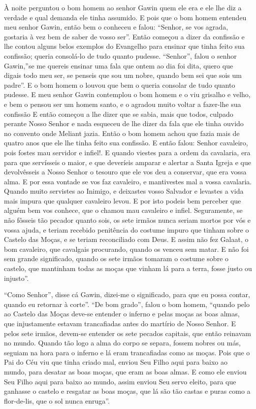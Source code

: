 À noite perguntou o bom homem ao senhor Gawin quem ele era e ele lhe diz a
verdade e qual demanda ele tinha assumido. E pois que o bom homem entendeu meu
senhor Gawin,  então bem o conheceu e falou: “Senhor, se vos agrada,
gostaria à vez bem de saber de vosso ser”. Então começou a dizer da confissão e
lhe contou alguns belos exemplos do Evangelho para ensinar que tinha feito sua
confissão; queria consolá-lo de tudo quanto pudesse. “Senhor”, falou o senhor
Gawin,”se me quereis ensinar uma fala que ontem ao dia foi dita, quero que
digais todo meu ser, se penseis que sou um nobre, quando bem sei que sois um
padre”.  E o bom homem o louvou que bem o queria consolar de tudo quanto
pudesse. E meu senhor Gawin  contemplou o bom homem e o viu grisalho e
velho, e bem o pensou ser um homem santo, e o agradou muito voltar a fazer-lhe
sua confissão E então começou a lhe dizer que se sabia, mais que todos, culpado
perante Nosso Senhor e nada esqueceu de lhe dizer da fala que ele tinha ouvido
no convento onde Meliant jazia. Então o bom homem achou que fazia mais de
quatro anos que ele lhe tinha feito sua confissão. E então falou: Senhor
cavaleiro, pois fostes mau servidor e infiel!. E quando viestes para a ordem da
cavalaria, era para que servísseis o maior, e que deveríeis amparar e alertar a
Santa Igreja e que devolvêsseis a Nosso Senhor o tesouro que ele vos deu a
conservar, que era vossa alma. E por essa vontade se vos faz cavaleiro, e
mantivestes mal a vossa cavalaria. Quando muito servistes ao Inimigo, e
deixastes vosso Salvador e levastes a vida mais impura que qualquer cavaleiro
levou. E por isto podeis bem perceber que alguém bem vos conhece, que o chamou
mau cavaleiro e infiel. Seguramente, se não fôsseis tão pecador quanto sois, os
sete irmãos nunca seriam mortos por vós e vossa ajuda, e teriam recebido
penitência do costume impuro que tinham sobre o Castelo das Moças, e se teriam
reconciliado com Deus. E assim não fez Galaat, o bom cavaleiro, que cavalgais
procurando, quando os venceu sem matar. E não foi sem grande significado,
quando os sete irmãos tomaram o costume sobre o castelo, que mantinham todas as
moças que vinham lá para a terra, fosse justo ou injusto”.  

“Como Senhor”, disse cá Gawin, dizei-me o significado, para que eu possa contar,
quando eu retornar à corte”. “De bom grado”, falou o bom homem, “quando pelo ao
Castelo das Moças deve-se entender o inferno e pelas moças as boas almas, que
injustamente estavam trancafiadas antes do martírio de Nosso Senhor. E pelos
sete irmãos, devem-se entender os sete pecados capitais, que então reinavam no
mundo. Quando tão logo a alma do corpo se separa, fossem nobres ou más, seguiam
na hora para o inferno e lá eram trancafiadas como as moças. Pois que o Pai do
Céu viu que tinha criado mal, enviou Seu Filho aqui para baixo ao mundo, para
desatar as boas moças, que eram as boas almas. E como ele enviou Seu Filho aqui
para baixo ao mundo, assim enviou Seu servo eleito, para que ganhasse o castelo
e resgatar as boas moças, que lá são tão castas e puras como a flor-de-lis, que
o sol nunca enruga”. 

